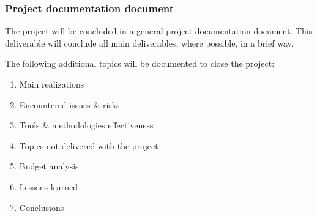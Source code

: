 \subsubsection{Project documentation document}
The project will be concluded in a general project documentation document.
This deliverable will conclude all main deliverables, where possible, in a brief way.

The following additional topics will be documented to close the project:
	\begin{enumerate}
		\item Main realizations
		\item Encountered issues \& risks
		\item Tools \& methodologies effectiveness
		\item Topics not delivered with the project
		\item Budget analysis
		\item Lessons learned
		\item Conclusions
	\end {enumerate}